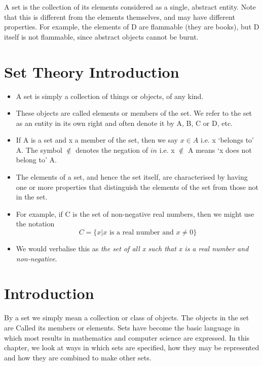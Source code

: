 \documentclass[12pt]{article}
\begin{document}
A set is the collection of its elements considered as a single, abstract entity. Note that this is different from the elements themselves, and may have different properties. For example, the elements of D are flammable (they are books), but D itself is not flammable, since abstract objects cannot be burnt.



\section{Set Theory Introduction}


\begin{itemize}
\item A set is simply a collection of things or objects, of any kind. 
\item These objects
are called elements or members of the set. We refer to the set as an
entity in its own right and often denote it by A, B, C or D, etc.
\item 
If A is a set and x a member of the set, then we say $x \in A$ i.e. x ‘belongs to’
A. The symbol $\notin$ denotes the negation of $in$  i.e. x $\notin$ A means ‘x does not
belong to’ A.
\end{itemize}

\begin{itemize}
\item The elements of a set, and hence the set itself, are characterised by having
one or more properties that distinguish the elements of the set from those
not in the set. 
\item For example, if C is the set of non-negative real numbers, then we
might use the notation
\[C = \{x | x \mbox{ is a real number and } x \neq 0\}\]
\item We would verbalise this as \textit{the set of all x such that x is a real number and non-negative}.
\end{itemize}



\section{Introduction} %
\smallskip 
By a set we simply mean a collection or class of objects. The objects in the set are Called its
members or elements. Sets have become the basic language in which most results in mathematics
and computer science are expressed. 
In this chapter, we look at ways in which sets are specified,
how they may be represented and how they are combined to make other sets.
\smallskip 
\end{document}
